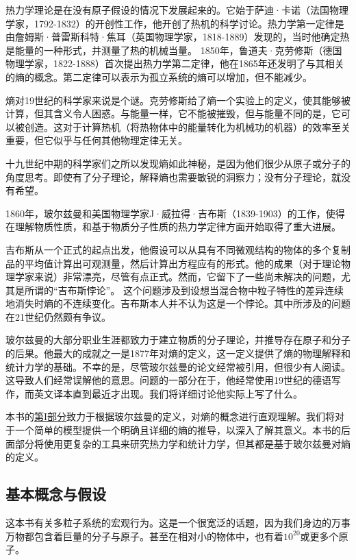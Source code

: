 \documentclass[UTF8]{ctexart}
\numberwithin{equation}{section}%
\numberwithin{figure}{section}%
\begin{document}
    热力学理论是在没有原子假设的情况下发展起来的。它始于萨迪·卡诺（法国物理学家，1792-1832）的开创性工作，他开创了热机的科学讨论。热力学第一定律是由詹姆斯·普雷斯科特·焦耳（英国物理学家，1818-1889）发现的，当时他确定热是能量的一种形式，并测量了热的机械当量。
    1850年，鲁道夫·克劳修斯（德国物理学家，1822-1888）首次提出热力学第二定律，他在1865年还发明了与其相关的熵的概念。第二定律可以表示为孤立系统的熵可以增加，但不能减少。

    熵对19世纪的科学家来说是个谜。克劳修斯给了熵一个实验上的定义，使其能够被计算，但其含义令人困惑。与能量一样，它不能被摧毁，但与能量不同的是，它可以被创造。这对于计算热机（将热物体中的能量转化为机械功的机器）的效率至关重要，但它似乎与任何其他物理定律无关。

    十九世纪中期的科学家们之所以发现熵如此神秘，是因为他们很少从原子或分子的角度思考。即使有了分子理论，解释熵也需要敏锐的洞察力；没有分子理论，就没有希望。

    1860年，玻尔兹曼和美国物理学家J·威拉得·吉布斯（1839-1903）的工作，使得在理解物质性质，和基于物质分子性质的热力学定律方面开始取得了重大进展。

    吉布斯从一个正式的起点出发，他假设可以从具有不同微观结构的物体的多个复制品的平均值计算出可观测量，然后计算出方程应有的形式。他的成果（对于理论物理学家来说）非常漂亮，尽管有点正式。然而，它留下了一些尚未解决的问题，尤其是所谓的“吉布斯悖论”。
    这个问题涉及到设想当混合物中粒子特性的差异连续地消失时熵的不连续变化。吉布斯本人并不认为这是一个悖论。其中所涉及的问题在21世纪仍然颇有争议。

    玻尔兹曼的大部分职业生涯都致力于建立物质的分子理论，并推导存在原子和分子的后果。他最大的成就之一是1877年对熵的定义，这一定义提供了熵的物理解释和统计力学的基础。不幸的是，尽管玻尔兹曼的论文经常被引用，但很少有人阅读。
    这导致人们经常误解他的意思。问题的一部分在于，他经常使用19世纪的德语写作，而英文译本直到最近才出现。我们将详细讨论他实际上写了什么。

    本书的\hyperref[part1]{第I部分}致力于根据玻尔兹曼的定义，对熵的概念进行直观理解。我们将对于一个简单的模型提供一个明确且详细的熵的推导，以深入了解其意义。本书的后面部分将使用更复杂的工具来研究热力学和统计力学，但其都是基于玻尔兹曼对熵的定义。

    \subsection{基本概念与假设}\label{sec1.4}
    这本书有关多粒子系统的宏观行为。这是一个很宽泛的话题，因为我们身边的万事万物都包含着巨量的分子与原子。甚至在相对小的物体中，也有着$10^{20}$或更多个原子。
\end{document}
